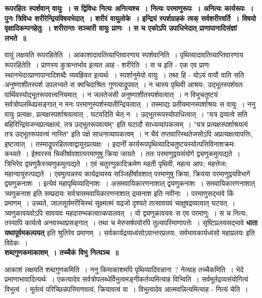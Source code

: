 {\bfseries रूपरहितः स्पर्शवान् वायुः~। स द्विविधः नित्यः अनित्यश्च~। नित्यः परमाणुरूपः~। अनित्यः कार्यरूपः~। पुनः त्रिविधः शरीरेन्द्रियविषयभेदात्~। शरीरं वायुलोके~। इन्द्रियं स्पर्शग्राहकं त्वक् सर्वशरीरवर्ति~। विषयो वृक्षादिकम्पनहेतुः~। शरीरान्तः सञ्चारी वायुः प्राणः~। स च एकोऽपि उपाधिभेदात् प्राणापानादिसंज्ञां लभते~॥}\par
	वायुं लक्षयति रूपरहितेति~। आकाशादावतिव्याप्तिवारणाय स्पर्शवानिति~। पृथिव्यादावतिव्याप्तिवारणाय रूपरहितेति~। प्राणस्य कुत्रान्तर्भाव इत्यत आह - शरीरेति~। स च इति - एक एव प्राणः स्थानभेदात्प्राणापानादिशब्दैः व्यवह्रियत इत्यर्थः~। स्पर्शानुमेयो वायुः~। तथा हि - योऽयं वायौ वाति सति अनुष्णाशीतस्पर्श उपलभ्यते स क्वचिदाश्रितः गुणत्वाद्रूपवत्~। न चास्य पृथिवी आश्रयः, उद्भूतस्पर्शवतः पार्थिवस्योद्भूतरूपवत्त्वनियमात्~। न जलतेजसी अनुष्णाशीतस्पर्शवत्वात्~। न विभुचतुष्टयं सर्वत्रोपलब्धिप्रसङ्गात् न मनः परमाणुस्पर्शस्यातीन्द्रियत्वात्~। तस्माद्यः प्रतीयमानस्पर्शाश्रयः स वायुः~। ननु वायुः प्रत्यक्षः, प्रत्यक्षस्पर्शाश्रयत्वात्~, घटवदिति चेत् न~। उद्भूतरूपस्योपाधित्वात्~। "यत्र द्रव्यत्वे सति बहिरिन्द्रियजन्यप्रत्यक्षत्वं, तत्र उद्भूतरूपवत्वम्" इति घटादौ साध्यव्यापकत्वम्~। "यत्र प्रत्यक्षस्पर्शाश्रयत्वं तत्र उद्भूतरूपवत्त्वं नास्ति" इति पक्षे साधनाव्यापकत्वम्~। न चैवं तप्तवारिस्थतेजसोऽपि अप्रत्यक्षत्वापत्तिः, इष्टत्वात्~। तस्माद्रूपरहितत्वाद्वायुरप्रत्यक्षः~। इदानीं कार्यरूपपृथिव्यादिचतुष्टयस्योत्पत्तिविनाशक्रमः कथ्यते~। ईश्वरस्य चिकीर्षावशात्परमाणुषु क्रिया जायते~। ततः परमाणुद्वयसंयोगे द्व्यणुकमुत्पद्यते~। त्रिभिरेव द्व्यणुकैस्त्र्यणुकमुत्पद्यते~। एवं चतुरणुकादिक्रमेण महती पृथिवी, महत्य आपः; महत्तेजः; महान्वायुरुत्पद्यते~। एवमुत्पन्नस्य कार्यद्रव्यस्य सञ्जिहीर्षावशात् परमाणुषु क्रिया, क्रियया परमाणुद्वयविभागे द्व्यणुकनाशः~। इत्येवं महापृथिव्यादिनाशः~। असमवायिकारणनाशात् द्व्यणुकनाशः~। समवायिकारणनाशात् त्र्यणुकनाश इति सम्प्रदायः सर्वत्रासमवायिकारणनाशात् द्रव्यनाश इति नवीनाः~। परमाणुसद्भावे किं प्रमाणम्~। उच्यते, जालसूर्यमरीचिस्थं सूक्ष्मतमं यद्रजो दृश्यते तत्सावयवं चाक्षुषद्रव्यत्वात् घटवत्~। त्र्यणुकावयवोऽपि सावयवः महदारम्भकत्वात्कपालवत्~। यो द्व्यणुकावयवः स एव परमाणुः~। स च नित्यः, तस्यापि कार्यत्वे अनवस्थाप्रसङ्गात्~। तथा च मेरुसर्षपयोरपि तुल्यपरिमाणापत्तेः~। सृष्टिप्रलयसद्भावे {\bfseries धाता यथापूर्वमकल्पयत्} इति श्रुतिरेव प्रमाणम्~। सर्वकार्यद्रव्यध्वंसोऽवान्तरप्रलयः, सर्वभावकार्यध्वंसो महाप्रलयः इति विवेकः~।\\[10pt]
{\bfseries शब्दगुणकमाकाशम्~। तच्चैकं विभु नित्यञ्च~॥}\par
	आकाशं लक्षयति शब्दगुणकमिति~। ननु किमाकाशमपि पृथिव्यादिवन्नाना~?
	नेत्याह तच्चैकमिति~। भेदे प्रमाणाभावादित्यर्थः~। एकत्वादेव सर्वत्रोपलब्धेर्विभुत्वमङ्गीकर्तव्यमित्याह विभ्विति~। सर्वमूर्तद्रव्यसंयोगित्वं विभुत्वं~। मूर्तत्वं परिच्छिन्नपरिमाणवत्वं, क्रियावत्वं वा~। विभुत्वादेव आत्मवन्नित्यमित्याह - नित्यं चेति~।\\[10pt]
